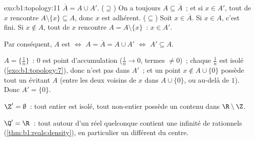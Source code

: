 \begin{solution}{exo:b1:topology:11}
$\overline A = A \cup A'$. ($\supseteq$) On a toujours $A \subseteq
\overline A$~; et si $x \in A'$, tout  de $x$ rencontre $A
\setminus \{x\} \subseteq A$, donc $x$ est adhérent. ($\subseteq$)
Soit $x \in \overline A$. Si $x \in A$, c'est fini. Si $x \notin A$,
tout  de $x$ rencontre $A = A \setminus \{x\}$~: $x \in
A'$.

Par conséquent, $A$ est  $\iff$ $A = \overline A = A \cup A'$
$\iff$ $A' \subseteq A$.

$A = \{\frac 1n\}$~: $0$ est point d'accumulation ($\frac 1n \to
0$, termes $\neq 0$)~; chaque $\frac 1n$ est isolé
(\cref{exo:b1:topology:7}), donc n'est pas dans $A'$~; et un point
$x \notin A \cup \{0\}$ possède tout un  évitant $A$
(entre les deux voisins de $x$ dans $A \cup \{0\}$, ou au-delà de
$1$). Donc $A' = \{0\}$.

$\Z' = \emptyset$~: tout entier est isolé, tout non-entier possède
un  contenu dans $\R \setminus \Z$.

$\Q' = \R$~: tout  autour d'un réel quelconque contient
une infinité de rationnels (\cref{thm:b1:reals:density}), en
particulier un différent du centre.
\end{solution}

